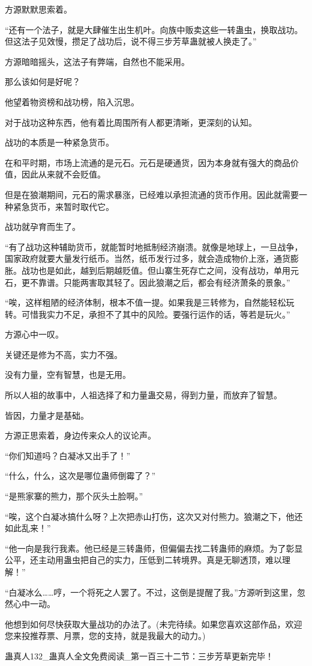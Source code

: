 \begin{this_body}
方源默默思索着。

“还有一个法子，就是大肆催生出生机叶。向族中贩卖这些一转蛊虫，换取战功。但这法子见效慢，攒足了战功后，说不得三步芳草蛊就被人换走了。”

方源暗暗摇头，这法子有弊端，自然也不能采用。

那么该如何是好呢？

他望着物资榜和战功榜，陷入沉思。

对于战功这种东西，他有着比周围所有人都更清晰，更深刻的认知。

战功的本质是一种紧急货币。

在和平时期，市场上流通的是元石。元石是硬通货，因为本身就有强大的商品价值，因此从来就不会贬值。

但是在狼潮期间，元石的需求暴涨，已经难以承担流通的货币作用。因此就需要一种紧急货币，来暂时取代它。

战功就孕育而生了。

“有了战功这种辅助货币，就能暂时地抵制经济崩溃。就像是地球上，一旦战争，国家政府就要大量发行纸币。当然，纸币发行过多，就会造成物价上涨，通货膨胀。战功也是如此，越到后期越贬值。但山寨生死存亡之间，没有战功，单用元石，更不靠谱。只能两害取其轻了。因此狼潮之后，都会有经济萧条的景象。”

“唉，这样粗陋的经济体制，根本不值一提。如果我是三转修为，自然能轻松玩转。可惜我实力不足，承担不了其中的风险。要强行运作的话，等若是玩火。”

方源心中一叹。

关键还是修为不高，实力不强。

没有力量，空有智慧，也是无用。

所以人祖的故事中，人祖选择了和力量蛊交易，得到力量，而放弃了智慧。

皆因，力量才是基础。

方源正思索着，身边传来众人的议论声。

“你们知道吗？白凝冰又出手了！”

“什么，什么，这次是哪位蛊师倒霉了？”

“是熊家寨的熊力，那个灰头土脸啊。”

“唉，这个白凝冰搞什么呀？上次把赤山打伤，这次又对付熊力。狼潮之下，他还如此乱来！”

“他一向是我行我素。他已经是三转蛊师，但偏偏去找二转蛊师的麻烦。为了彰显公平，还主动用蛊虫把自己的实力，压低到二转境界。真是无聊透顶，难以理解！”

“白凝冰么……哼，一个将死之人罢了。不过，这倒是提醒了我。”方源听到这里，忽然心中一动。

他想到如何尽快获取大量战功的办法了。(未完待续。如果您喜欢这部作品，欢迎您来投推荐票、月票，您的支持，就是我最大的动力。)

蛊真人132\_蛊真人全文免费阅读\_第一百三十二节：三步芳草更新完毕！

\end{this_body}

